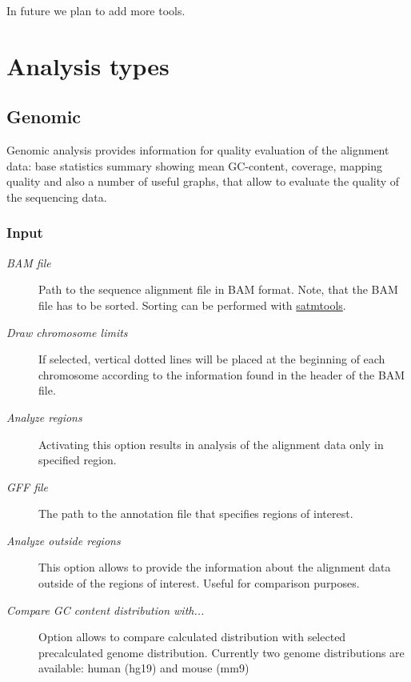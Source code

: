 \documentclass[a4paper,10pt,english]{sphinxmanual}
\begin{document}
In future we plan to add more tools.


\chapter{Analysis types}
\label{analysis:analysis-types}\label{analysis::doc}\label{analysis:id1}

\section{Genomic}
\label{analysis:genomic}\label{analysis:id2}
Genomic analysis provides information for quality evaluation of the alignment data: base statistics summary showing mean GC-content, coverage, mapping quality and also a number of useful graphs, that allow to evaluate the quality of the sequencing data.


\subsection{Input}
\label{analysis:input}\begin{description}
\item[{\emph{BAM file}}] \leavevmode
Path to the sequence alignment file in BAM format. Note, that the BAM file has to be sorted. Sorting can be performed with \href{http://samtools.sourceforge.net/}{satmtools}.

\item[{\emph{Draw chromosome limits}}] \leavevmode
If selected, vertical dotted lines will be placed at the beginning of each chromosome according to the information found in the header of the BAM file.

\item[{\emph{Analyze regions}}] \leavevmode
Activating this option results in analysis of the alignment data only in specified region.

\item[{\emph{GFF file}}] \leavevmode
The path to the annotation file that specifies regions of interest.

\item[{\emph{Analyze outside regions}}] \leavevmode
This option allows to provide the information about the alignment data outside of the regions of interest. Useful for comparison purposes.

\item[{\emph{Compare GC content distribution with...}}] \leavevmode
Option allows to compare calculated distribution with selected precalculated genome distribution. Currently two genome distributions are available: human (hg19) and mouse (mm9)

\end{description}
\end{document}
